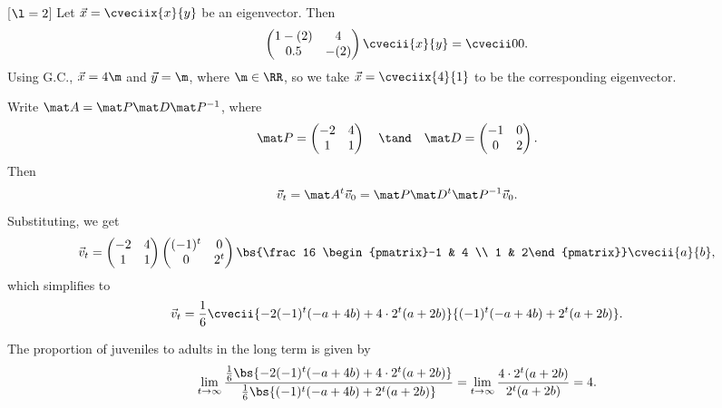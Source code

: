 \begin{solution}
\begin{ppart}
\begin{psubpart}
            [$\l = 2$] Let $\vec x = \cveciix{x}{y}$ be an eigenvector. Then \[\begin{pmatrix}1-(2) & 4 \\ 0.5 & -(2)\end{pmatrix} \cvecii{x}{y} = \cvecii00.\] Using G.C., $\vec x = 4\m$ and $\vec y = \m$, where $\m \in \RR$, so we take $\vec x = \cveciix{4}{1}$ to be the corresponding eigenvector.
        \end{psubpart}
        \begin{psubpart}
            Write $\mat A = \mat P \mat D \mat P^{-1}$, where \[\mat P = \begin{pmatrix}-2 & 4 \\ 1 & 1\end{pmatrix} \quad \tand \quad \mat D = \begin{pmatrix}-1 & 0 \\ 0 & 2\end{pmatrix}.\] Then \[\vec v_t = \mat A^t \vec v_0 = \mat P \mat D^t \mat P^{-1} \vec v_0.\] Substituting, we get \[\vec v_t = \begin{pmatrix}-2 & 4 \\ 1 & 1\end{pmatrix} \begin{pmatrix}(-1)^t & 0 \\ 0 & 2^t\end{pmatrix} \bs{\frac16 \begin{pmatrix}-1 & 4 \\ 1 & 2\end{pmatrix}} \cvecii{a}{b},\] which simplifies to \[\vec v_t = \frac16 \cvecii{-2(-1)^t (-a+4b) + 4\cdot2^t(a+2b)}{(-1)^t (-a+4b) + 2^t(a+2b)}.\]
        \end{psubpart}
        \begin{psubpart}
            The proportion of juveniles to adults in the long term is given by \[\lim_{t \to \infty} \frac{\frac16 \bs{-2(-1)^t (-a+4b) + 4\cdot2^t(a+2b)}}{\frac16 \bs{(-1)^t (-a+4b) + 2^t(a+2b)}} = \lim_{t \to \infty} \frac{4\cdot2^t(a+2b)}{2^t(a+2b)} = 4.\]
        \end{psubpart}
    \end{ppart}
\end{solution}